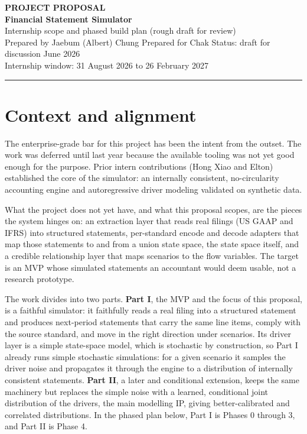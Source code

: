 \documentclass[11pt]{article}
\begin{document}
\color{bodytext}

\begin{flushleft}
{\color{gold}\bfseries PROJECT PROPOSAL}\\[3pt]
{\color{navy}\bfseries\fontsize{26}{30}\selectfont Financial Statement Simulator}\\[4pt]
{\color{slate}\large Internship scope and phased build plan (rough draft for review)}\\[6pt]
{\color{slate}\small Prepared by Jaebum (Albert) Chung \quad\textbar\quad Prepared for Chak \quad\textbar\quad Status: draft for discussion \quad\textbar\quad June 2026}\\[3pt]
{\color{slate}\small Internship window: 31 August 2026 to 26 February 2027}
\end{flushleft}
\vspace{4pt}
{\color{gold}\rule{\linewidth}{2pt}}
\vspace{6pt}

\section{Context and alignment}
The enterprise-grade bar for this project has been the intent from the outset. The work was deferred until last year because the available tooling was not yet good enough for the purpose. Prior intern contributions (Hong Xiao and Elton) established the core of the simulator: an internally consistent, no-circularity accounting engine and autoregressive driver modeling validated on synthetic data.

What the project does not yet have, and what this proposal scopes, are the pieces the system hinges on: an extraction layer that reads real filings (US GAAP and IFRS) into structured statements, per-standard encode and decode adapters that map those statements to and from a union state space, the state space itself, and a credible relationship layer that maps scenarios to the flow variables. The target is an MVP whose simulated statements an accountant would deem usable, not a research prototype.

The work divides into two parts. \textbf{Part I}, the MVP and the focus of this proposal, is a faithful simulator: it faithfully reads a real filing into a structured statement and produces next-period statements that carry the same line items, comply with the source standard, and move in the right direction under scenarios. Its driver layer is a simple state-space model, which is stochastic by construction, so Part I already runs simple stochastic simulations: for a given scenario it samples the driver noise and propagates it through the engine to a distribution of internally consistent statements. \textbf{Part II}, a later and conditional extension, keeps the same machinery but replaces the simple noise with a learned, conditional joint distribution of the drivers, the main modelling IP, giving better-calibrated and correlated distributions. In the phased plan below, Part I is Phases 0 through 3, and Part II is Phase 4.
\end{document}
